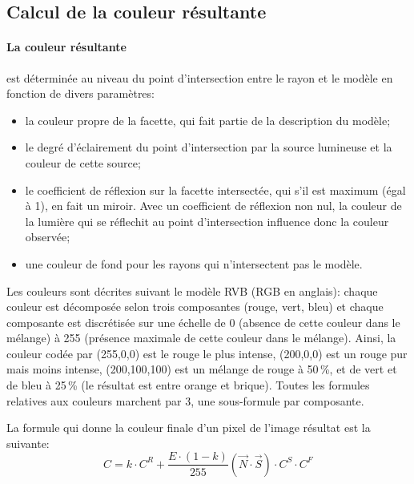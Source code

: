 \documentclass[10pt, a4paper ]{article}
\begin{document}
\subsection{Calcul de la couleur résultante}

\paragraph{La couleur résultante} est déterminée au niveau du point
d'intersection entre le rayon et le modèle en fonction de divers paramètres:
\begin{itemize}
    \item la couleur propre de la facette, qui fait partie de la description du
        modèle;
    \item le degré d'éclairement du point d'intersection par la source lumineuse
        et la couleur de cette source;
    \item le coefficient de réflexion sur la facette intersectée,
        qui s'il est maximum (égal à 1), en fait un miroir. Avec un coefficient de
        réflexion non nul, la couleur de la lumière qui se réflechit au point
        d'intersection influence donc la couleur observée;
    \item une couleur de fond pour les rayons qui n'intersectent pas le modèle.
\end{itemize}

Les couleurs sont décrites suivant le modèle RVB (RGB en anglais): chaque
couleur est décomposée selon trois composantes (rouge, vert, bleu) et chaque
composante est  discrétisée sur une échelle de 0 (absence de cette couleur dans
le mélange) à 255 (présence maximale de cette couleur dans le mélange). Ainsi,
la couleur codée par (255,0,0) est le rouge le plus intense, (200,0,0) est un
rouge pur mais moins intense, (200,100,100) est un mélange de rouge à 50\,\%, et
de vert et de bleu à 25\,\% (le résultat est entre orange et brique). Toutes les
formules relatives aux couleurs marchent par 3, une sous-formule par composante.

La formule qui donne la couleur finale d'un pixel de l'image résultat est la
suivante:
\begin{equation}
    C = k\cdot C^R + \frac{E\cdot(1-k)}{255}\left( \overrightarrow{N}\cdot\overrightarrow{S}
    \right)\cdot C^S\cdot C^F
    \label{eqn:C}
\end{equation}
\end{document}

